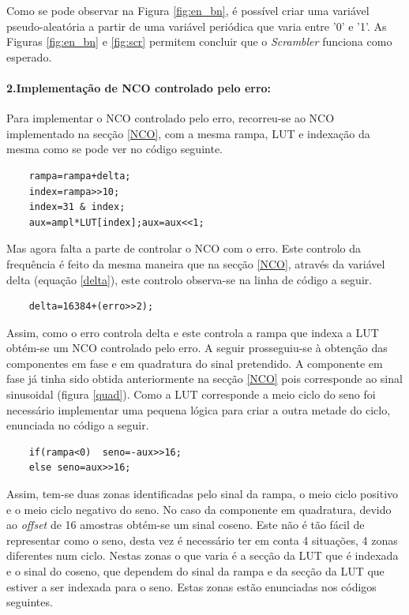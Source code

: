 \documentclass[11pt]{article}
\numberwithin{equation}{section}
\begin{document}
	Como se pode observar na Figura \ref{fig:en_bn}, é possível criar uma variável pseudo-aleatória a partir de uma variável periódica que varia entre '0' e '1'. As Figuras \ref{fig:en_bn} e \ref{fig:scr} permitem concluir que o \textit{Scrambler} funciona como esperado.
	
	\paragraph{2.Implementação de NCO controlado pelo erro:} \hspace{0pt} \label{para:P3-2}
	
	Para implementar o NCO controlado pelo erro, recorreu-se ao NCO implementado na secção \ref{NCO}, com a mesma rampa, LUT e indexação da mesma como se pode ver no código seguinte.
	\begin{lstlisting}
	rampa=rampa+delta;
	index=rampa>>10;
	index=31 & index;
	aux=ampl*LUT[index];aux=aux<<1;
	\end{lstlisting}
	
	Mas agora falta a parte de controlar o NCO com o erro. Este controlo da frequência é feito da mesma maneira que na secção \ref{NCO}, através da variável delta (equação \ref{delta}), este controlo observa-se na linha de código a seguir.
	\begin{lstlisting}
	delta=16384+(erro>>2);
	\end{lstlisting}
	
	Assim, como o erro controla delta e este controla a rampa que indexa a LUT obtém-se um NCO controlado pelo erro.
	A seguir prosseguiu-se à obtenção das componentes em fase e em quadratura do sinal pretendido. A componente em fase já tinha sido obtida anteriormente na secção \ref{NCO} pois corresponde ao sinal sinusoidal (figura \ref{quad}). Como a LUT corresponde a meio ciclo do seno foi necessário implementar uma pequena lógica para criar a outra metade do ciclo, enunciada no código a seguir.
	\begin{lstlisting}
	if(rampa<0)  seno=-aux>>16;
	else seno=aux>>16;
	\end{lstlisting}
	
	Assim, tem-se duas zonas identificadas pelo sinal da rampa, o meio ciclo positivo e o meio ciclo negativo do seno.
	No caso da componente em quadratura, devido ao \textit{offset} de 16 amostras obtém-se um sinal coseno. Este não é tão fácil de representar como o seno, desta vez é necessário ter em conta 4 situações, 4 zonas diferentes num ciclo. Nestas zonas o que varia é a secção da LUT que é indexada e o sinal do coseno, que dependem do sinal da rampa e da secção da LUT que estiver a ser indexada para o seno. Estas zonas estão enunciadas nos códigos seguintes.
	\vspace{1mm}
	
\end{document}
